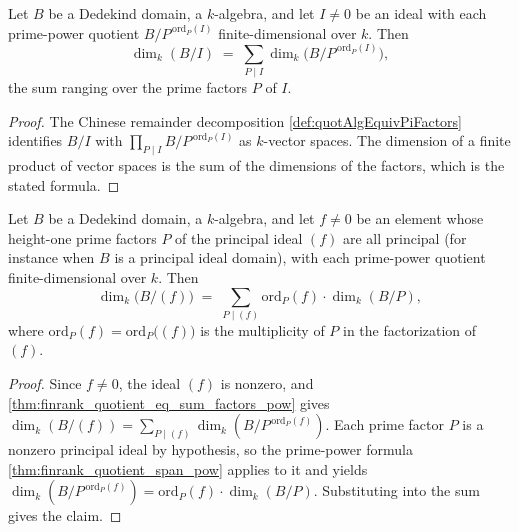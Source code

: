 \begin{theorem}
  \label{thm:finrank_quotient_eq_sum_factors_pow}
  \leanok
  Let \(B\) be a Dedekind domain, a \(k\)-algebra, and let \(I \neq 0\) be an ideal with each
  prime-power quotient \(B/P^{\,\mathrm{ord}_P(I)}\) finite-dimensional over \(k\). Then
  \[
    \dim_k(B/I) \;=\; \sum_{P \mid I} \dim_k\bigl(B/P^{\,\mathrm{ord}_P(I)}\bigr) ,
  \]
  the sum ranging over the prime factors \(P\) of \(I\).
\end{theorem}
\begin{proof}
  \leanok
  The Chinese remainder decomposition \ref{def:quotAlgEquivPiFactors} identifies
  \(B/I\) with \(\prod_{P \mid I} B/P^{\,\mathrm{ord}_P(I)}\) as \(k\)-vector spaces.
  The dimension of a finite product of vector spaces is the sum of the dimensions of
  the factors, which is the stated formula.
\end{proof}

\begin{theorem}
  \label{thm:finrank_quotient_span_eq_sum_ord}
  \leanok
  Let \(B\) be a Dedekind domain, a \(k\)-algebra, and let \(f \neq 0\) be an element whose
  height-one prime factors \(P\) of the principal ideal \((f)\) are all principal (for instance
  when \(B\) is a principal ideal domain), with each prime-power quotient finite-dimensional
  over \(k\). Then
  \[
    \dim_k\bigl(B/(f)\bigr) \;=\; \sum_{P \mid (f)} \mathrm{ord}_P(f) \cdot \dim_k(B/P) ,
  \]
  where \(\mathrm{ord}_P(f) = \mathrm{ord}_P\bigl((f)\bigr)\) is the multiplicity of \(P\) in
  the factorization of \((f)\).
\end{theorem}
\begin{proof}
  \leanok
  Since \(f \neq 0\), the ideal \((f)\) is nonzero, and \ref{thm:finrank_quotient_eq_sum_factors_pow}
  gives \(\dim_k(B/(f)) = \sum_{P \mid (f)} \dim_k(B/P^{\,\mathrm{ord}_P(f)})\). Each prime
  factor \(P\) is a nonzero principal ideal by hypothesis, so the prime-power formula
  \ref{thm:finrank_quotient_span_pow} applies to it and yields
  \(\dim_k(B/P^{\,\mathrm{ord}_P(f)}) = \mathrm{ord}_P(f) \cdot \dim_k(B/P)\). Substituting into
  the sum gives the claim.
\end{proof}

